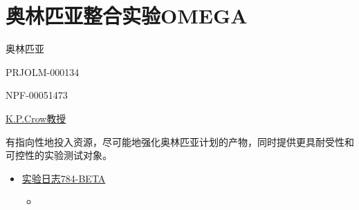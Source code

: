 \chapter{奥林匹亚整合实验OMEGA}

\label{chap:TALE-olympia-integration-experiment-omega}

奥林匹亚

PRJOLM-000134

NPF-00051473

\hyperref[chap:AUTHOR-kain-pathos-crow]{K.P.Crow教授}

有指向性地投入资源，尽可能地强化奥林匹亚计划的产物，同时提供更具耐受性和可控性的实验测试对象。


\begin{itemize}
\item \hyperref[chap:DOC-experiment-log-784-beta]{实验日志784-BETA}\begin{itemize}
\item {}
\end{itemize}

\end{itemize}
